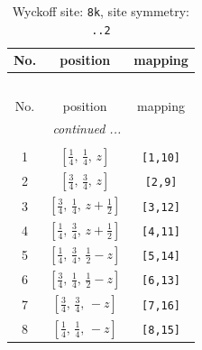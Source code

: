 \documentclass[fleqn,8pt]{jsarticle}
\begin{document}
\begin{longtable}{ccc}
\caption{Wyckoff site: {\tt 8k}, site symmetry: {\tt ..2}}
 \\
 \hline \hline
No. & position & mapping \\ \hline \endfirsthead

\multicolumn{2}{l}{\tablename\ \thetable{}} \\
 \hline \hline
No. & position & mapping \\ \hline \endhead

 \hline \hline
\multicolumn{2}{r}{\footnotesize\it continued ...} \\ \endfoot

 \hline \hline
\multicolumn{2}{r}{} \\ \endlastfoot

1 & $\left[ \frac{1}{4},\, \frac{1}{4},\, z \right]$ & {\tt [1,10]} \\ \hline
2 & $\left[ \frac{3}{4},\, \frac{3}{4},\, z \right]$ & {\tt [2,9]} \\ \hline
3 & $\left[ \frac{3}{4},\, \frac{1}{4},\, z + \frac{1}{2} \right]$ & {\tt [3,12]} \\ \hline
4 & $\left[ \frac{1}{4},\, \frac{3}{4},\, z + \frac{1}{2} \right]$ & {\tt [4,11]} \\ \hline
5 & $\left[ \frac{1}{4},\, \frac{3}{4},\, \frac{1}{2} - z \right]$ & {\tt [5,14]} \\ \hline
6 & $\left[ \frac{3}{4},\, \frac{1}{4},\, \frac{1}{2} - z \right]$ & {\tt [6,13]} \\ \hline
7 & $\left[ \frac{3}{4},\, \frac{3}{4},\, - z \right]$ & {\tt [7,16]} \\ \hline
8 & $\left[ \frac{1}{4},\, \frac{1}{4},\, - z \right]$ & {\tt [8,15]} \\
\end{longtable}
\renewcommand{\arraystretch}{1.2}
\end{document}
